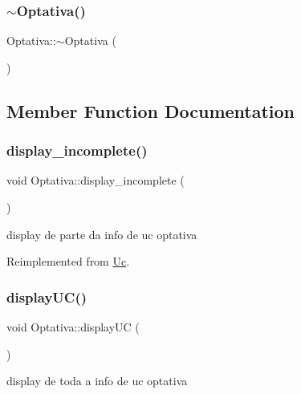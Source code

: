 \subsubsection{\texorpdfstring{$\sim$\+Optativa()}{~Optativa()}}
{\footnotesize\ttfamily Optativa\+::$\sim$\+Optativa (\begin{DoxyParamCaption}{ }\end{DoxyParamCaption})\hspace{0.3cm}{\ttfamily [inline]}}



\subsection{Member Function Documentation}
\hypertarget{class_optativa_a6e8cf85b9ccacb15ad7a217f55120b9f}{}\label{class_optativa_a6e8cf85b9ccacb15ad7a217f55120b9f} 
\subsubsection{\texorpdfstring{display\+\_\+incomplete()}{display\_incomplete()}}
{\footnotesize\ttfamily void Optativa\+::display\+\_\+incomplete (\begin{DoxyParamCaption}{ }\end{DoxyParamCaption})\hspace{0.3cm}{\ttfamily [virtual]}}

display de parte da info de uc optativa 

Reimplemented from \hyperlink{class_uc_a32e7d62a706731268ef22f5d0c76793f}{Uc}.

\hypertarget{class_optativa_a48019eb60424bdad456c22c7c7656082}{}\label{class_optativa_a48019eb60424bdad456c22c7c7656082} 
\subsubsection{\texorpdfstring{display\+U\+C()}{displayUC()}}
{\footnotesize\ttfamily void Optativa\+::display\+UC (\begin{DoxyParamCaption}{ }\end{DoxyParamCaption})\hspace{0.3cm}{\ttfamily [virtual]}}

display de toda a info de uc optativa 

